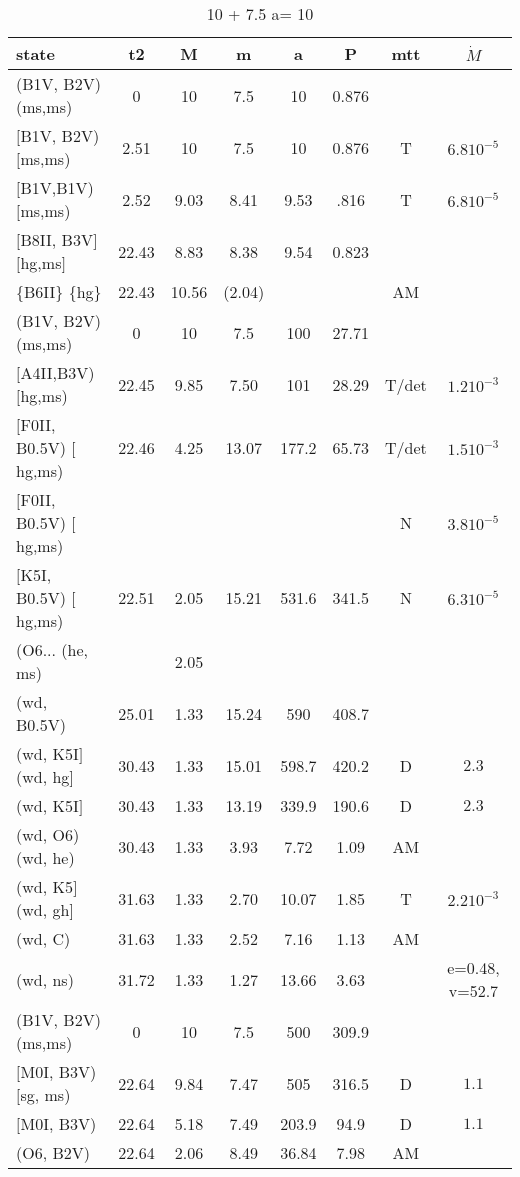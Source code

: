 \documentclass{article}
\begin{document}
\begin{table}
\caption{ 10 + 7.5 a= 10}
\begin{tabular}{p{4cm}ccccccc}
\hline
state	 		& t2	& M	& m	& a	& P	& mtt	&$\dot{M}$	\\ \hline 
(B1V, B2V) (ms,ms)      & 0	& 10	& 7.5	& 10	& 0.876	&	&		\\
$[$B1V, B2V) $[$ms,ms)	& 2.51	& 10 	& 7.5	& 10	& 0.876	& T	& $6.8 10^{-5}$         \\
$[$B1V,B1V)  $[$ms,ms)	& 2.52	& 9.03	& 8.41	& 9.53	& .816	& T	& $6.8 10^{-5}$ 	\\
$[$B8II, B3V$]$ $[$hg,ms$]$	& 22.43	& 8.83	& 8.38	& 9.54	& 0.823	&	&			\\
\{B6II\} \{hg\}	 	& 22.43	& 10.56	&(2.04)	&	&	& AM	&			\\ \hline
(B1V, B2V) (ms,ms)	& 0	& 10	& 7.5	& 100	& 27.71	&	&			\\
$[$A4II,B3V) $[$hg,ms)	& 22.45	& 9.85	& 7.50	& 101	& 28.29	& T/det	& $1.2 10^{-3}$		\\
$[$F0II, B0.5V) $[$hg,ms)	& 22.46	& 4.25	& 13.07	& 177.2	& 65.73	& T/det	& $1.5 10^{-3}$		\\
$[$F0II, B0.5V) $[$hg,ms)	& 	& 	&	&	&	& N	& $3.8 10^{-5}$		\\
$[$K5I, B0.5V) $[$hg,ms) 	& 22.51	& 2.05	& 15.21	& 531.6	& 341.5	& N	& $6.3 10^{-5}$		\\
(O6...	  (he, ms)	&      	& 2.05	&	&	&	&	&			\\
(wd, B0.5V)	 	& 25.01	& 1.33	& 15.24	& 590	& 408.7	&	&			\\
(wd, K5I$]$ (wd, hg$]$	& 30.43	& 1.33	& 15.01	& 598.7	& 420.2	& D	& $2.3$			\\
(wd, K5I$]$	 	& 30.43	& 1.33	& 13.19	& 339.9	& 190.6	& D	& $2.3$			\\
(wd, O6) (wd, he)	& 30.43	& 1.33	& 3.93	& 7.72	& 1.09	& AM	&			\\
(wd, K5$]$ (wd, gh$]$	& 31.63	& 1.33	& 2.70	& 10.07	& 1.85	& T	& $2.2 10^{-3}$		\\
(wd, C)		 	& 31.63	& 1.33	& 2.52	& 7.16	& 1.13	& AM	&			\\
(wd, ns)	 	& 31.72	& 1.33	& 1.27	& 13.66	& 3.63	&	& e=0.48, v=52.7	\\ \hline
(B1V, B2V) (ms,ms)	& 0	& 10	& 7.5	& 500	& 309.9	&	&			\\
$[$M0I, B3V) $[$sg, ms)	& 22.64	& 9.84	& 7.47	& 505	& 316.5	& D	& $1.1$			\\
$[$M0I, B3V)	 	& 22.64	& 5.18	& 7.49	& 203.9	& 94.9	& D	& $1.1$			\\
(O6, B2V)	 	& 22.64	& 2.06	& 8.49	& 36.84	& 7.98	& AM	&			\\

\end{tabular}
\end{table}
\end{document}
